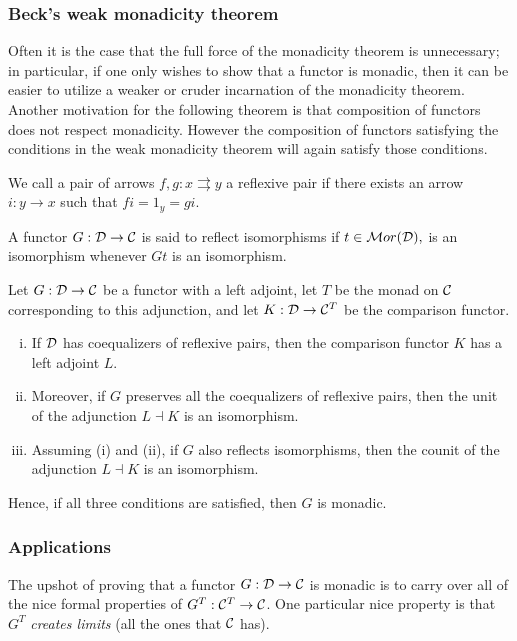 \documentclass[12pt]{article}
\begin{document}
\subsubsection{Beck's weak monadicity theorem}
Often it is the case that the full force of the monadicity theorem is unnecessary; in particular, if one only wishes to show that a functor is monadic, then it can be easier to utilize a weaker or cruder incarnation of the monadicity theorem. Another motivation for the following theorem is that composition of functors does not respect monadicity. However the composition of functors satisfying the conditions in the weak monadicity theorem will again satisfy those conditions.

We call a pair of arrows $f,g:x\rightrightarrows y$ a reflexive pair if there exists an arrow $i:y\to x$ such that $fi=1_y=gi.$

A functor $G:\mathcal{D}\to\mathcal{C}$ is said to reflect isomorphisms if $t\in\mathcal{M}or(\mathcal{D}),$ is an isomorphism whenever $Gt$ is an isomorphism.

\begin{thm}
    Let $G:\mathcal{D}\to\mathcal{C}$ be a functor with a left adjoint, let $T$ be the monad on $\mathcal{C}$ corresponding to this adjunction, and let $K:\mathcal{D}\to\mathcal{C}^T$ be the comparison functor.
    \begin{enumerate}[i)]
        \item If $\mathcal{D}$ has coequalizers of reflexive pairs, then the comparison functor $K$ has a left adjoint $L.$
        \item Moreover, if $G$ preserves all the coequalizers of reflexive pairs, then the unit of the adjunction $L\dashv K$ is an isomorphism.
        \item Assuming (i) and (ii), if $G$ also reflects isomorphisms, then the counit of the adjunction $L\dashv K$ is an isomorphism.
    \end{enumerate}
    Hence, if all three conditions are satisfied, then $G$ is monadic.
\end{thm}

\newpage
\subsubsection{Applications}

The upshot of proving that a functor $G: \mathcal{D}\to \mathcal{C}$ is monadic is to carry over all of the nice formal properties of $G^T: \mathcal{C}^T \to \mathcal{C}$. One particular nice property is that $G^T$ \textit{creates limits} (all the ones that $\mathcal{C}$ has).
\end{document}
